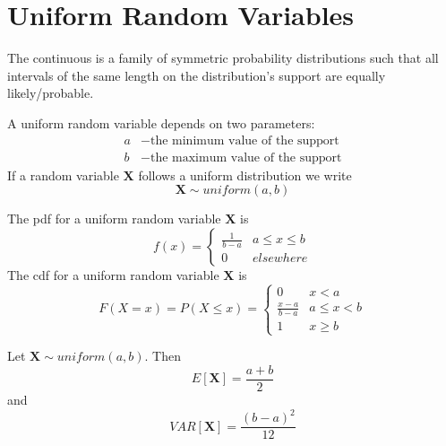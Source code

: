 \documentclass[12pt]{report}
\begin{document}
\section{Uniform Random Variables}

\begin{defn}{}{}
    The continuous  is a family of symmetric probability distributions such that all intervals of the same length on the distribution's support are equally likely/probable.
\end{defn}

\begin{defn}{}{}
    A uniform random variable depends on two parameters: \begin{align*}
        a &- \text{the minimum value of the support} \\
        b &- \text{the maximum value of the support}
    \end{align*}
    If a random variable $\mathbf{X}$ follows a uniform distribution we write $$\mathbf{X}\sim uniform(a,b)$$
\end{defn}

\begin{defn}{}{}
    The pdf for a uniform random variable $\mathbf{X}$ is \begin{equation*}
        f(x) = \left\{\begin{array}{cc} \frac{1}{b-a} & a \leq x \leq b \\ 0 & elsewhere \end{array}\right.
    \end{equation*}
    The cdf for a uniform  random variable $\mathbf{X}$ is \begin{equation*}
        F(X = x) = P(X\leq x) =  \left\{\begin{array}{cc} 0 & x < a \\ \frac{x-a}{b-a} & a \leq x < b \\ 1 & x \geq b \end{array}\right.
    \end{equation*}
\end{defn}

\begin{defn}{}{}
    Let $\mathbf{X}\sim uniform(a,b)$. Then \begin{equation*}
        E[\mathbf{X}] = \frac{a+b}{2}
    \end{equation*}
    and
    \begin{equation*}
        VAR[\mathbf{X}] = \frac{(b-a)^2}{12}
    \end{equation*}
\end{defn}
\end{document}
